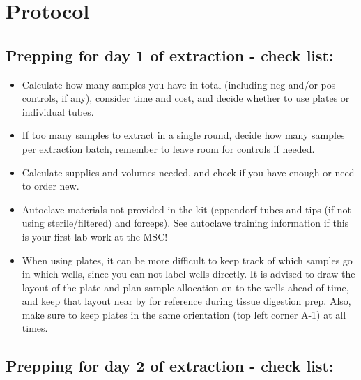 \documentclass[
  letterpaper,
  DIV=11,
  numbers=noendperiod]{scrreprt}
\begin{document}
\hypertarget{protocol-2}{%
\section*{\texorpdfstring{\textbf{Protocol}}{Protocol}}\label{protocol-2}}


\hypertarget{prepping-for-day-1-of-extraction---check-list}{%
\subsection*{\texorpdfstring{\textbf{Prepping for day 1 of extraction -
check
list:}}{Prepping for day 1 of extraction - check list:}}\label{prepping-for-day-1-of-extraction---check-list}}

\begin{itemize}
\item
  Calculate how many samples you have in total (including neg and/or pos
  controls, if any), consider time and cost, and decide whether to use
  plates or individual tubes.
\item
  If too many samples to extract in a single round, decide how many
  samples per extraction batch, remember to leave room for controls if
  needed.
\item
  Calculate supplies and volumes needed, and check if you have enough or
  need to order new.
\item
  Autoclave materials not provided in the kit (eppendorf tubes and tips
  (if not using sterile/filtered) and forceps). See autoclave training
  information if this is your first lab work at the MSC!
\item
  When using plates, it can be more difficult to keep track of which
  samples go in which wells, since you can not label wells directly. It
  is advised to draw the layout of the plate and plan sample allocation
  on to the wells ahead of time, and keep that layout near by for
  reference during tissue digestion prep. Also, make sure to keep plates
  in the same orientation (top left corner A-1) at all times.
\end{itemize}

\hypertarget{prepping-for-day-2-of-extraction---check-list}{%
\subsection*{\texorpdfstring{\textbf{Prepping for day 2 of extraction -
check
list:}}{Prepping for day 2 of extraction - check list:}}\label{prepping-for-day-2-of-extraction---check-list}}
\end{document}
